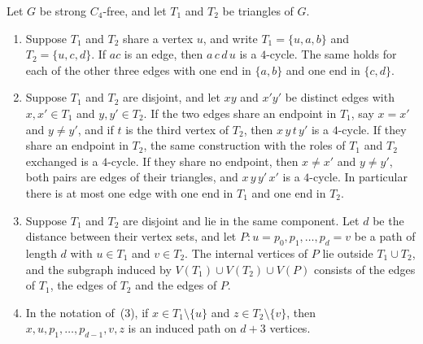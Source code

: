 \documentclass[ASNA]{USG}
\theoremstyle{WBstyletwo}
\numberwithin{equation}{section}
\begin{document}
\begin{lemma}\label{lem:connect}
Let $G$ be strong $C_4$-free, and let $T_1$ and $T_2$ be triangles of $G$.
\begin{enumerate}
\item Suppose $T_1$ and $T_2$ share a vertex $u$, and write $T_1=\{u,a,b\}$ and $T_2=\{u,c,d\}$. If $ac$ is an edge, then $a\,c\,d\,u$ is a $4$-cycle. The same holds for each of the other three edges with one end in $\{a,b\}$ and one end in $\{c,d\}$.
\item Suppose $T_1$ and $T_2$ are disjoint, and let $xy$ and $x'y'$ be distinct edges with $x,x'\in T_1$ and $y,y'\in T_2$. If the two edges share an endpoint in $T_1$, say $x=x'$ and $y\neq y'$, and if $t$ is the third vertex of $T_2$, then $x\,y\,t\,y'$ is a $4$-cycle. If they share an endpoint in $T_2$, the same construction with the roles of $T_1$ and $T_2$ exchanged is a $4$-cycle. If they share no endpoint, then $x\neq x'$ and $y\neq y'$, both pairs are edges of their triangles, and $x\,y\,y'\,x'$ is a $4$-cycle. In particular there is at most one edge with one end in $T_1$ and one end in $T_2$.
\item Suppose $T_1$ and $T_2$ are disjoint and lie in the same component. Let $d$ be the distance between their vertex sets, and let $P:u=p_0,p_1,\ldots,p_d=v$ be a path of length $d$ with $u\in T_1$ and $v\in T_2$. The internal vertices of $P$ lie outside $T_1\cup T_2$, and the subgraph induced by $V(T_1)\cup V(T_2)\cup V(P)$ consists of the edges of $T_1$, the edges of $T_2$ and the edges of $P$.
\item In the notation of~(3), if $x\in T_1\setminus\{u\}$ and $z\in T_2\setminus\{v\}$, then $x,u,p_1,\ldots,p_{d-1},v,z$ is an induced path on $d+3$ vertices.
\end{enumerate}
\end{lemma}
\end{document}
